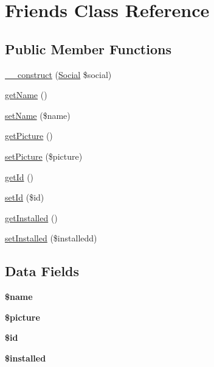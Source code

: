 \hypertarget{class_friends}{\section{Friends Class Reference}
\label{class_friends}
}
\subsection*{Public Member Functions}
\begin{DoxyCompactItemize}
\item 
\hyperlink{class_friends_ad07e6b7f7a6cd38bd1b21cf48da4a5d0}{\+\_\+\+\_\+construct} (\hyperlink{class_social}{Social} \$social)
\item 
\hyperlink{class_friends_a3d0963e68bb313b163a73f2803c64600}{get\+Name} ()
\item 
\hyperlink{class_friends_a2fe666694997d047711d7653eca2f132}{set\+Name} (\$name)
\item 
\hyperlink{class_friends_aa10a041137b00a6f0a79916f4009924f}{get\+Picture} ()
\item 
\hyperlink{class_friends_ad822b1785ceddeb91452e90dd910d2ee}{set\+Picture} (\$picture)
\item 
\hyperlink{class_friends_a12251d0c022e9e21c137a105ff683f13}{get\+Id} ()
\item 
\hyperlink{class_friends_a87313ad678fb2a2a8efb435cf0bdb9a0}{set\+Id} (\$id)
\item 
\hyperlink{class_friends_a52d8bb380e32a740669971ecfeb4f20e}{get\+Installed} ()
\item 
\hyperlink{class_friends_a3cee28ab7c58291268134a13694c2654}{set\+Installed} (\$installedd)
\end{DoxyCompactItemize}
\subsection*{Data Fields}
\begin{DoxyCompactItemize}
\item 
\hypertarget{class_friends_ab2fc40d43824ea3e1ce5d86dee0d763b}{{\bfseries \$name}}\label{class_friends_ab2fc40d43824ea3e1ce5d86dee0d763b}

\item 
\hypertarget{class_friends_a6ed313adb3a8ef1daf8fafdc842b09d1}{{\bfseries \$picture}}\label{class_friends_a6ed313adb3a8ef1daf8fafdc842b09d1}

\item 
\hypertarget{class_friends_ae97941710d863131c700f069b109991e}{{\bfseries \$id}}\label{class_friends_ae97941710d863131c700f069b109991e}

\item 
\hypertarget{class_friends_abedccaa71dcf3d3f5c392fad3b3df965}{{\bfseries \$installed}}\label{class_friends_abedccaa71dcf3d3f5c392fad3b3df965}

\end{DoxyCompactItemize}


